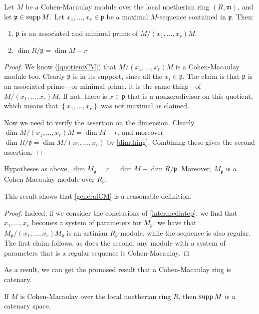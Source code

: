 \begin{proposition} \label{CMintermediatep}
Let $M$ be a Cohen-Macaulay module over the local noetherian ring $(R,
\mathfrak{m})$, and let $\mathfrak{p} \in \operatorname{supp} M$.
Let $x_1, \dots, x_r \in \mathfrak{p}$ be a maximal $M$-sequence contained in
$\mathfrak{p}$. Then:
\begin{enumerate}
\item $\mathfrak{p}$ is an associated and minimal prime of $M/(x_1, \dots, x_r)M$. 
\item $\dim R/\mathfrak{p} = \dim M -r$
\end{enumerate}
\end{proposition} 
\begin{proof} 
We know (\cref{quotientCM}) that $M/(x_1, \dots, x_r)M$ is a Cohen-Macaulay module too. 
Clearly $\mathfrak{p}$ is in its support, since all the $x_i \in
\mathfrak{p}$. 
The claim is that $\mathfrak{p}$ is an associated prime---or minimal prime, it
is the same thing---of $M/(x_1, \dots, x_r)M$. If not, there is $x \in
\mathfrak{p}$ that is a nonzerodivisor on this quotient, which means that
$\left\{x_1, \dots, x_r\right\}$ was not maximal as claimed. 

Now we need to verify the assertion on the dimension. Clearly $\dim M/(x_1,
\dots, x_r)M = \dim M - r$, and moreover $\dim R/\mathfrak{p} =
\dim M/(x_1, \dots, x_r)$ by \cref{dimthing}. Combining these gives
the second assertion.
\end{proof} 

\begin{corollary} \label{CMloc}
Hypotheses as above, 
 $\dim M_{\mathfrak{p}}  = r = \dim M - \dim R/\mathfrak{p} $.
Moreover, $M_{\mathfrak{p}}$ is a Cohen-Macaulay module over
$R_{\mathfrak{p}}$.
\end{corollary} 
This result shows that \cref{generalCM} is a reasonable definition.
\begin{proof} 
Indeed, if we consider the conclusions of \cref{intermediatep}, we find that
$x_1, \dots, x_r$ becomes a system of parameters for $M_{\mathfrak{p}}$: we
have that $M_{\mathfrak{p}}/(x_1, \dots, x_r)M_{\mathfrak{p}}$ is an
artinian $R_{\mathfrak{p}}$-module, while the sequence is also regular. The
first claim follows, as does the second: any module with a system of
parameters that is a regular sequence is Cohen-Macaulay.
\end{proof} 

As a result, we can get the promised result that a Cohen-Macaulay ring is
catenary.
\begin{proposition} 
If $M$ is Cohen-Macaulay over the local noetherian ring $R$, then $\operatorname{supp} M$ is a catenary space.
\end{proposition} 

